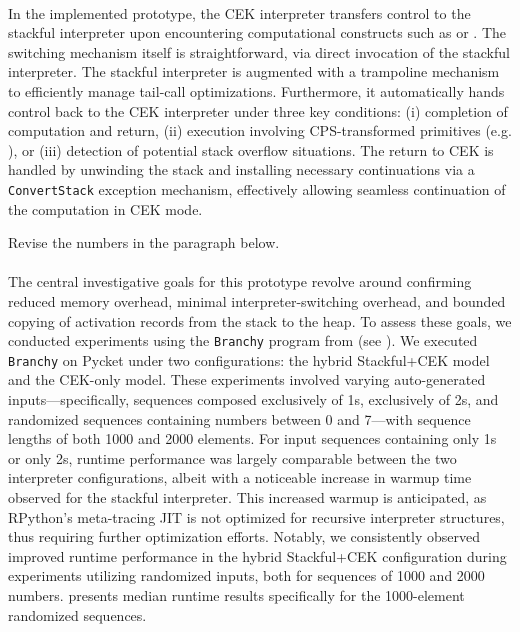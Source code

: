       \paragraph{}%
        In the implemented prototype, the CEK interpreter transfers control to the stackful interpreter upon encountering computational constructs such as  or . The switching mechanism itself is straightforward, via direct invocation of the stackful interpreter. The stackful interpreter is augmented with a trampoline mechanism to efficiently manage tail-call optimizations. Furthermore, it automatically hands control back to the CEK interpreter under three key conditions: (i) completion of computation and return, (ii) execution involving CPS-transformed primitives (e.g. ), or (iii) detection of potential stack overflow situations. The return to CEK is handled by unwinding the stack and installing necessary continuations via a \verb|ConvertStack| exception mechanism, effectively allowing seamless continuation of the computation in CEK mode.

      \begin{todo}
        Revise the numbers in the paragraph below.
      \end{todo}

      \paragraph{}%
        The central investigative goals for this prototype revolve around confirming reduced memory overhead, minimal interpreter-switching overhead, and bounded copying of activation records from the stack to the heap. To assess these goals, we conducted experiments using the \texttt{Branchy} program from  (see ). We executed \texttt{Branchy} on Pycket under two configurations: the hybrid Stackful+CEK model and the CEK-only model. These experiments involved varying auto-generated inputs—specifically, sequences composed exclusively of 1s, exclusively of 2s, and randomized sequences containing numbers between 0 and 7—with sequence lengths of both 1000 and 2000 elements. For input sequences containing only 1s or only 2s, runtime performance was largely comparable between the two interpreter configurations, albeit with a noticeable increase in warmup time observed for the stackful interpreter. This increased warmup is anticipated, as RPython's meta-tracing JIT is not optimized for recursive interpreter structures, thus requiring further optimization efforts. Notably, we consistently observed improved runtime performance in the hybrid Stackful+CEK configuration during experiments utilizing randomized inputs, both for sequences of 1000 and 2000 numbers.  presents median runtime results specifically for the 1000-element randomized sequences.

